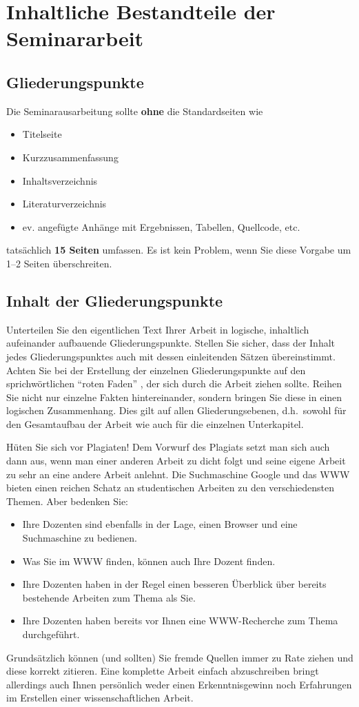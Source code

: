 %
\section{Inhaltliche Bestandteile der Seminararbeit}
\label{sec_inhalt}

\subsection{Gliederungspunkte}

Die Seminarausarbeitung sollte {\bf ohne} die Standardseiten wie
\begin{itemize}
\item Titelseite
\item Kurzzusammenfassung
\item Inhaltsverzeichnis
\item Literaturverzeichnis
\item ev. angefügte Anhänge mit Ergebnissen, Tabellen, Quellcode, etc.
\end{itemize}
tatsächlich {\bf 15 Seiten} umfassen. 
Es ist kein Problem, wenn Sie diese Vorgabe um 1--2 Seiten überschreiten.


\subsection{Inhalt der Gliederungspunkte}
Unterteilen Sie den eigentlichen Text Ihrer Arbeit in logische, inhaltlich aufeinander aufbauende Gliederungspunkte.
Stellen Sie sicher, dass der Inhalt jedes Gliederungspunktes auch mit dessen einleitenden Sätzen übereinstimmt.
Achten Sie bei der Erstellung der einzelnen Gliederungspunkte auf den sprichwörtlichen "`roten Faden"' , der sich durch die Arbeit ziehen sollte.
Reihen Sie nicht nur einzelne Fakten hintereinander, sondern bringen Sie diese in einen logischen Zusammenhang.
Dies gilt auf allen Gliederungsebenen, d.h.~sowohl für den Gesamtaufbau der Arbeit wie auch für die einzelnen Unterkapitel.

\smallskip

Hüten Sie sich vor Plagiaten!
Dem Vorwurf des Plagiats setzt man sich auch dann aus, wenn man einer anderen Arbeit zu dicht folgt und seine eigene Arbeit zu sehr an eine andere Arbeit anlehnt.
Die Suchmaschine Google und das WWW bieten einen reichen Schatz an studentischen Arbeiten zu den verschiedensten Themen.
Aber bedenken Sie:
\begin{itemize}
\item Ihre Dozenten sind ebenfalls in der Lage, einen Browser und eine Suchmaschine zu bedienen.
\item Was Sie im WWW finden, können auch Ihre Dozent finden.
\item Ihre Dozenten haben in der Regel einen besseren Überblick über bereits bestehende Arbeiten zum Thema als Sie.
\item Ihre Dozenten haben bereits vor Ihnen eine WWW-Recherche zum Thema durchgeführt.
\end{itemize}
Grundsätzlich können (und sollten) Sie fremde Quellen immer zu Rate ziehen und diese korrekt zitieren.
Eine komplette Arbeit einfach abzuschreiben bringt allerdings auch Ihnen persönlich weder einen Erkenntnisgewinn noch Erfahrungen im Erstellen einer wissenschaftlichen Arbeit.


